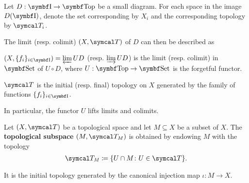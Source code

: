 \begin{proposition}\label{thm:initial_final_topology_limit}\cite{nLab:top}
  Let \( D: \Bold I \to \Bold{Top} \) be a small diagram. For each space in the image \( D(\Bold I) \), denote the set corresponding by \( X_i \) and the corresponding topology by \( \Cal{T}_i \).

  The limit (resp. colimit) \( (X, \Cal{T}) \) of \( D \) can then be described as
  \begin{defenum}
    \item \( (X, \{ f_i \}_{i \in \Bold{I}}) = \varprojlim UD \) (resp. \( \varinjlim UD \)) is the limit (resp. colimit) in \( \Bold{Set} \) of \( U \circ D \), where \( U: \Bold{Top} \to \Bold{Set} \) is the forgetful functor.
    \item \( \Cal{T} \) is the initial (resp. final) topology on \( X \) generated by the family of functions \( \{ f_i \}_{i \in \Bold{I}} \).
  \end{defenum}

  In particular, the functor \( U \) lifts limits and colimits.
\end{proposition}

\begin{definition}\label{def:topological_subspace}
  Let \( (X, \Cal{T}) \) be a topological space and let \( M \subseteq X \) be a subset of \( X \). The \textbf{topological subspace} \( (M, \Cal{T}_M) \) is obtained by endowing \( M \) with the topology
  \begin{align*}
    \Cal{T}_M \coloneqq \{ U \cap M \colon U \in \Cal{T} \}.
  \end{align*}

  It is the initial topology generated by the canonical injection map \( \iota: M \to X \).
\end{definition}

